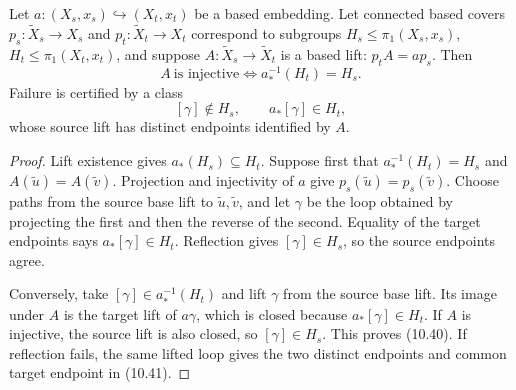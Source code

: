 \begin{proposition}\label{prop:subgroup-reflection}
Let \(a:(X_s,x_s)\hookrightarrow(X_t,x_t)\) be a based embedding. Let connected based covers \(p_s:\tilde X_s\to X_s\) and \(p_t:\tilde X_t\to X_t\) correspond to subgroups \(H_s\le\pi_1(X_s,x_s)\), \(H_t\le\pi_1(X_t,x_t)\), and suppose \(A:\tilde X_s\to\tilde X_t\) is a based lift: \(p_tA=ap_s\). Then
\[
A\ \text{is injective}\iff a_*^{-1}(H_t)=H_s. \tag{10.40}
\]
Failure is certified by a class
\[
[\gamma]\notin H_s,\qquad a_*[\gamma]\in H_t, \tag{10.41}
\]
whose source lift has distinct endpoints identified by \(A\).
\end{proposition}

\begin{proof}
Lift existence gives \(a_*(H_s)\subseteq H_t\). Suppose first that \(a_*^{-1}(H_t)=H_s\) and \(A(\tilde u)=A(\tilde v)\). Projection and injectivity of \(a\) give \(p_s(\tilde u)=p_s(\tilde v)\). Choose paths from the source base lift to \(\tilde u,\tilde v\), and let \(\gamma\) be the loop obtained by projecting the first and then the reverse of the second. Equality of the target endpoints says \(a_*[\gamma]\in H_t\). Reflection gives \([\gamma]\in H_s\), so the source endpoints agree.

Conversely, take \([\gamma]\in a_*^{-1}(H_t)\) and lift \(\gamma\) from the source base lift. Its image under \(A\) is the target lift of \(a\gamma\), which is closed because \(a_*[\gamma]\in H_t\). If \(A\) is injective, the source lift is also closed, so \([\gamma]\in H_s\). This proves (10.40). If reflection fails, the same lifted loop gives the two distinct endpoints and common target endpoint in (10.41).
\end{proof}